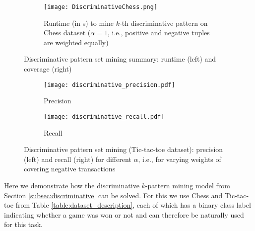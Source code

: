 \begin{figure}[thb]
\begin{subfigure}{.56\textwidth}
  \captionsetup{skip = 0pt}
\begin{center}
  \texttt{[image: DiscriminativeChess.png]}
  \caption{Runtime (in s) to mine $k$-th discriminative pattern on Chess dataset ($\alpha = 1$, i.e., positive and negative tuples are weighted equally)}
  \label{figure:discriminative_chess}
 \end{center}
\end{subfigure}
\begin{subfigure}{.43\textwidth}
\begin{center}
\captionsetup{skip = 0pt, font=small}
\label{table:discriminative_results}
\end{center}
\end{subfigure}
\caption{Discriminative pattern set mining summary: runtime (left) and coverage (right)}
\end{figure}

\begin{figure}[thb]
\begin{center}
\begin{subfigure}{.49\textwidth}
  \captionsetup{skip = -3pt}
  \texttt{[image: discriminative\_precision.pdf]}
  \caption{Precision}
\end{subfigure}
   \hfill 
\begin{subfigure}{.49\textwidth}
  \captionsetup{skip = -3pt}
  \texttt{[image: discriminative\_recall.pdf]}
  \caption{Recall}
 \end{subfigure}
 \end{center}
  \captionsetup{skip = -4pt}
  \caption{Discriminative pattern set mining (Tic-tac-toe dataset): precision (left) and recall (right) for different $\alpha$, i.e., for varying weights of covering  negative transactions}
  \label{fig:discriminative_precision_recall}
\end{figure}
 Here we demonstrate how the discriminative $k$-pattern mining model from Section \ref{subsec:discriminative} can be solved. For this we use Chess and Tic-tac-toe from Table \ref{table:dataset_description}, each of which has a binary class label indicating whether a game was won or not and can therefore be naturally used for this task. 

